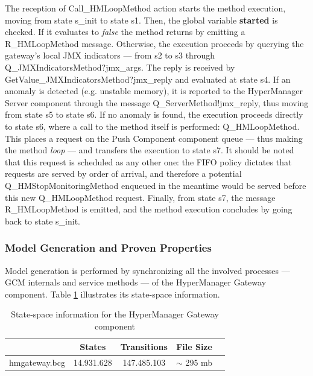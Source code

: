 	\noindent The reception of \textsf{Call\_HMLoopMethod} action starts the method execution, 
    moving from state \textsf{s\_init} to state \textsf{s1}. Then, the global variable \textbf{started} is checked.
    If it evaluates to \textit{false} the method returns by emitting a \textsf{R\_HMLoopMethod}
    message. Otherwise, the execution proceeds by querying the gateway's local \ac{JMX} indicators 
    --- from \textsf{s2} to \textsf{s3} through \textsf{Q\_JMXIndicatorsMethod?jmx\_args}. The reply
    is received by \textsf{GetValue\_JMXIndicatorsMethod?jmx\_reply} and evaluated at state \textsf{s4}.
	If an anomaly is detected (e.g. unstable memory), it is reported to the \textsf{HyperManager Server} component
	through the message \textsf{Q\_ServerMethod!jmx\_reply}, thus 
	moving from state \textsf{s5} to state \textsf{s6}. If no anomaly is found, the execution proceeds directly
	to state \textsf{s6}, where a call to the method itself is performed: \textsf{Q\_HMLoopMethod}. This places
	a request on the \textsf{Push Component} component queue --- thus making the method \textit{loop} --- and
	transfers the execution to state \textsf{s7}. It should be noted that this request is scheduled as any other 
	one: the \ac{FIFO} policy dictates that requests are served by order of arrival, and therefore a potential
	 \textsf{Q\_HMStopMonitoringMethod} enqueued in the meantime would be served before this new 
	 \textsf{Q\_HMLoopMethod} request.        
	Finally, from state \textsf{s7}, the message \textsf{R\_HMLoopMethod} is emitted, and the method execution
	concludes by going back to state \textsf{s\_init}.
  


\subsubsection{Model Generation and Proven Properties}
		
		Model generation is performed by synchronizing all the involved processes --- 
		\ac{GCM} internals and service methods --- of the \textsf{HyperManager Gateway} component.		
		Table \ref{tab:modelG} illustrates its state-space information. 		

\begin{table}[H]
\begin{center}
\begin{tabular}{| l | c | c | c | c |}
\hline
                             &  \textbf{States} & \textbf{Transitions} & \textbf{File Size} \\
\hline
   \textsf{hmgateway.bcg}            &  14.931.628  &  147.485.103  &  $\sim$ 295 mb\\
  \hline
\end{tabular}
\end{center}
\caption{State-space information for the \textsf{HyperManager Gateway} component}
\label{tab:modelG}
\end{table}

